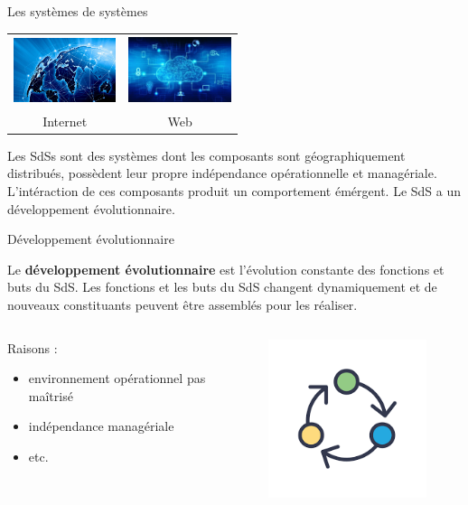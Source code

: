 \begin{frame}{Les systèmes de systèmes}
\begin{tabular}{cc}
\includegraphics[width=3cm, height=2cm]{imgs/internet.jpg} &
\includegraphics[width=3cm, height=2cm]{imgs/web.jpg}\\
Internet & Web \\
\end{tabular}
\begin{definition}
 Les SdSs sont des systèmes dont les composants sont géographiquement
distribués, possèdent leur propre indépendance opérationnelle et
managériale. 
L'intéraction de ces composants produit un comportement émérgent. Le
SdS a un développement évolutionnaire. 
\end{definition}
\end{frame}

\begin{frame}{Développement évolutionnaire}
\begin{definition}{}
Le \textbf{développement évolutionnaire} est l'évolution constante des
fonctions et buts du SdS. Les fonctions et les buts du SdS changent
dynamiquement et de nouveaux constituants peuvent être assemblés pour
les réaliser.
\end{definition}

\begin{columns}[t]
\begin{column}{5cm}
Raisons : 
\begin{itemize}
\item environnement opérationnel pas maîtrisé
\item indépendance managériale
\item etc.
\end{itemize}
\end{column}
\begin{column}{5cm}
\begin{figure}
\centering
\includegraphics[scale=0.4]{imgs/evolutionnaire.png}
\end{figure}
\end{column}
\end{columns}
\end{frame}


